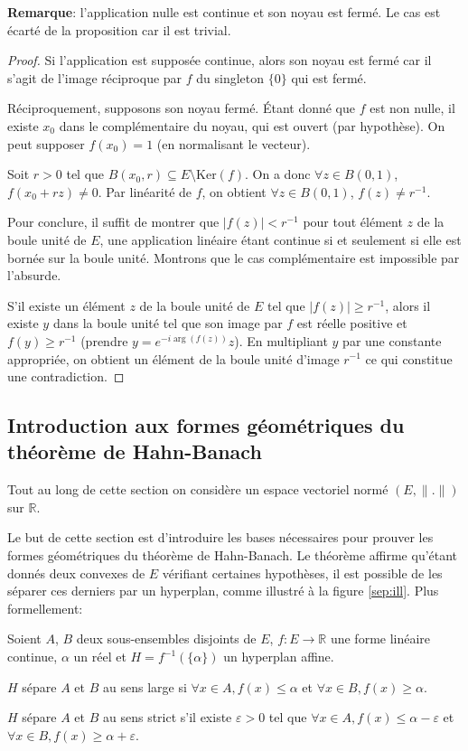 \textbf{Remarque}: l'application nulle est continue et son
noyau est fermé. Le cas est écarté de la proposition car
il est trivial.

\begin{proof}
  Si l'application est supposée continue, alors son noyau est
  fermé car il s'agit de l'image réciproque par $f$ du singleton
  $\{0\}$ qui est fermé.

  Réciproquement, supposons son noyau fermé. \'{E}tant donné que
  $f$ est non nulle, il existe $x_0$ dans le complémentaire du
  noyau, qui est ouvert (par hypothèse). On peut supposer $f(x_0)=1$
  (en normalisant le vecteur).

  Soit $r>0$ tel que $B(x_0, r)\subseteq E\setminus\mathrm{Ker}(f)$.
  On a donc $\forall z\in B(0, 1)$, $f(x_0 + rz )\neq 0$. Par
  linéarité de $f$, on obtient
  $\forall z\in B(0, 1)$, $f(z)\neq r^{-1}$.

  Pour conclure, il suffit de montrer que $|f(z)|< r^{-1}$ pour tout
  élément $z$ de la boule unité de $E$, une application linéaire
  étant continue si et seulement si elle est bornée sur la boule
  unité. Montrons que le
  cas complémentaire est impossible par l'absurde.

  S'il existe un élément $z$ de la boule unité de $E$ tel que
  $|f(z)|\geq r^{-1}$, alors il existe $y$ dans la boule unité
  tel que son image par $f$ est réelle positive et $f(y)\geq r^{-1}$
  (prendre $y = e^{-i\arg(f(z))}z$). En multipliant $y$ par une
  constante appropriée, on obtient un élément de la boule
  unité d'image $r^{-1}$ ce qui constitue une contradiction.

\end{proof}

\subsection{Introduction aux formes géométriques du
  théorème de Hahn-Banach}

Tout au long de cette section on considère un espace vectoriel
normé $(E, \|.\|)$ sur $\mathbb{R}$.

Le but de cette section est d'introduire les bases nécessaires
pour prouver les formes géométriques du théorème de Hahn-Banach.
Le théorème affirme qu'étant donnés deux convexes de $E$
vérifiant certaines hypothèses, il est
possible de les séparer ces derniers par un hyperplan, comme
illustré à la figure \ref{sep:ill}. Plus formellement:


\begin{df}
  Soient $A$, $B$ deux sous-ensembles disjoints de $E$,
  $f:E\to\mathbb{R}$ une forme linéaire continue, $\alpha$ un
  réel et $H = f^{-1}(\{\alpha\})$ un hyperplan affine.

  $H$ sépare $A$ et $B$ au sens large si $\forall x\in A,
  f(x)\leq \alpha$ et $\forall x\in B, f(x)\geq \alpha$.

  $H$ sépare $A$ et $B$ au sens strict s'il existe
  $\varepsilon > 0$ tel que $\forall x\in A, f(x)\leq \alpha
  - \varepsilon$ et $\forall x\in B, f(x)\geq \alpha + \varepsilon$.
\end{df}

